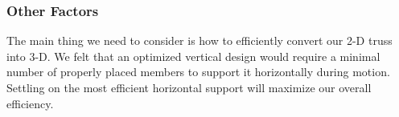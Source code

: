 \subsubsection{Other Factors}

The main thing we need to consider is how to efficiently convert our 2-D truss into 3-D. We felt that an optimized vertical design would require a minimal number of properly placed members to support it horizontally during motion. Settling on the most efficient horizontal support will maximize our overall efficiency.